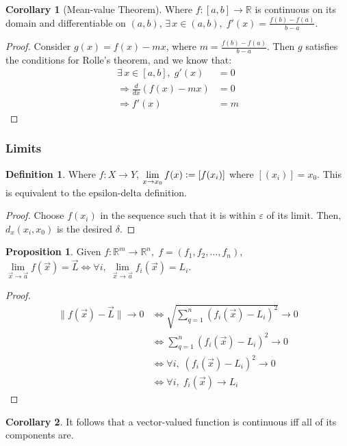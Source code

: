\documentclass{article}
\theoremstyle{definition}
\newtheorem{defn}{Definition}[subsubsection]
\newtheorem{cor}{Corollary}[subsubsection]
\newtheorem{prop}{Proposition}[subsubsection]
\begin{document}
\begin{cor}[Mean-value Theorem]
	Where $f:[a,b]\rightarrow \mathbb{R}$ is continuous on its domain and differentiable on $(a,b)$, $\exists\,x\in (a,b),\;f'(x)=\frac{f(b)-f(a)}{b-a}$.
\end{cor}
\begin{proof}
	Consider $g(x)=f(x)-mx$, where $m=\frac{f(b)-f(a)}{b-a}$. Then $g$ satisfies the conditions for Rolle's theorem, and we know that:
	\begin{align*}
		\exists\,x\in [a,b],\;g'(x)&=0\\
		\Rightarrow\frac{d}{dx}(f(x)-mx)&=0\\
		\Rightarrow f'(x)&=m
	\end{align*}
\end{proof}
\newpage
\subsubsection{Limits}
\begin{defn}
	Where $f:X\rightarrow Y$, $\lim\limits_{x\rightarrow x_0}f(x)\vcentcolon=[f(x_i)]$ where $[(x_i)]=x_0$. This is equivalent to the epsilon-delta definition.
\end{defn}
\begin{proof}
	Choose $f(x_i)$ in the sequence such that it is within $\varepsilon$ of its limit. Then, $d_x(x_i,x_0)$ is the desired $\delta$.
\end{proof}
\begin{prop}
	Given $f:\mathbb{R}^m\rightarrow \mathbb{R}^n,\; f=(f_1,f_2,\dots,f_n)$, 
	$\lim\limits_{\vec x\rightarrow\vec a}f(\vec x)=\vec L\iff \forall i,\;\lim\limits_{\vec x\rightarrow\vec a}f_i(\vec x)=L_i.$
\end{prop}
\begin{proof}
	\begin{align*}
		\lVert f(\vec x)-\vec L\rVert\rightarrow0&\iff\sqrt{\sum_{q=1}^n(f_i(\vec x)-L_i)^2}\rightarrow0\\
		&\iff\sum_{q=1}^n(f_i(\vec x)-L_i)^2\rightarrow0\\
		&\iff\forall i,\;(f_i(\vec x)-L_i)^2\rightarrow0\tag*{(each term is positive)}\\
		&\iff\forall i,\;f_i(\vec x)\rightarrow L_i
	\end{align*}
\end{proof}
\begin{cor}
	It follows that a vector-valued function is continuous iff all of its components are.
\end{cor}
\end{document}
